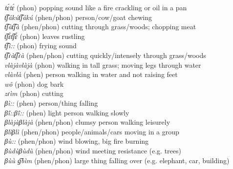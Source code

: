 \documentclass[output=paper,colorlinks,citecolor=brown]{langscibook}
\begin{document}
\begin{tabbing}
\textit{tɛ́tɛ́}                               \>(phon) popping sound like a fire crackling or oil in a pan                                              \\
\textit{t͡ʃákút͡ʃákú}                     \>(phen/phon) person/cow/goat chewing                                                                     \\
\textit{t͡ʃàt͡ʃà}                           \>(phen/phon) cutting through grass/woods; chopping meat                                             \\
\textit{t͡ʃɛ̀t͡ʃɛ̀}                           \>(phon) leaves rustling                                                                                  \\
\textit{t͡ʃì::}                            \>(phon) frying sound                                                                                     \\
\textit{t͡ʃɾàt͡ʃɾà}                         \>(phen/phon) cutting quickly/intensely through grass/woods                                            \\
\textit{vlàjàvlàjà}                       \>(phon)  walking in tall grass; moving legs through water                                       \\
\textit{vlàvlà}                             \>(phen)  person walking in water and not raising feet                                                       \\
\textit{wô}                                \>(phon) dog bark                                                                                         \\
\textit{zɾìm}                                \>(phon) cutting                                                                                          \\
\textit{βì::}                                \>(phen) person/thing falling                                                                                    \\
\textit{βĩ́::βĩ́::}                       \>(phen) light person walking slowly                                                                          \\
\textit{βlàjàβlàjà}                       \>(phen/phon) clumsy person walking leisurely                                                             \\
\textit{βlìβlì}                             \>(phen/phon) people/animals/cars moving in a group                                                       \\
\textit{βù::}                                \>(phen/phon) wind blowing, big fire burning                                                              \\
\textit{βùdùβùdù}                         \>(phen/phon) wind meeting resistance (e.g. trees)                                         \\
                                                                
\textit{βùù g͡bìm}                         \>(phen/phon) large thing falling over (e.g. elephant, car, building) 
\end{tabbing}


{\sloppy\printbibliography[heading=subbibliography,notkeyword=this]}
\end{document}
